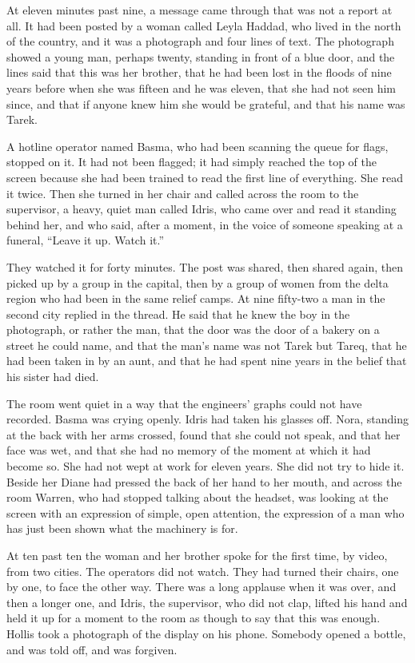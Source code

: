 At eleven minutes past nine, a message came through that was not a report at all. It had been posted by a woman called Leyla Haddad, who lived in the north of the country, and it was a photograph and four lines of text. The photograph showed a young man, perhaps twenty, standing in front of a blue door, and the lines said that this was her brother, that he had been lost in the floods of nine years before when she was fifteen and he was eleven, that she had not seen him since, and that if anyone knew him she would be grateful, and that his name was Tarek.

A hotline operator named Basma, who had been scanning the queue for flags, stopped on it. It had not been flagged; it had simply reached the top of the screen because she had been trained to read the first line of everything. She read it twice. Then she turned in her chair and called across the room to the supervisor, a heavy, quiet man called Idris, who came over and read it standing behind her, and who said, after a moment, in the voice of someone speaking at a funeral, ``Leave it up. Watch it.''

They watched it for forty minutes. The post was shared, then shared again, then picked up by a group in the capital, then by a group of women from the delta region who had been in the same relief camps. At nine fifty-two a man in the second city replied in the thread. He said that he knew the boy in the photograph, or rather the man, that the door was the door of a bakery on a street he could name, and that the man's name was not Tarek but Tareq, that he had been taken in by an aunt, and that he had spent nine years in the belief that his sister had died.

The room went quiet in a way that the engineers' graphs could not have recorded. Basma was crying openly. Idris had taken his glasses off. Nora, standing at the back with her arms crossed, found that she could not speak, and that her face was wet, and that she had no memory of the moment at which it had become so. She had not wept at work for eleven years. She did not try to hide it. Beside her Diane had pressed the back of her hand to her mouth, and across the room Warren, who had stopped talking about the headset, was looking at the screen with an expression of simple, open attention, the expression of a man who has just been shown what the machinery is for.

At ten past ten the woman and her brother spoke for the first time, by video, from two cities. The operators did not watch. They had turned their chairs, one by one, to face the other way. There was a long applause when it was over, and then a longer one, and Idris, the supervisor, who did not clap, lifted his hand and held it up for a moment to the room as though to say that this was enough. Hollis took a photograph of the display on his phone. Somebody opened a bottle, and was told off, and was forgiven.

